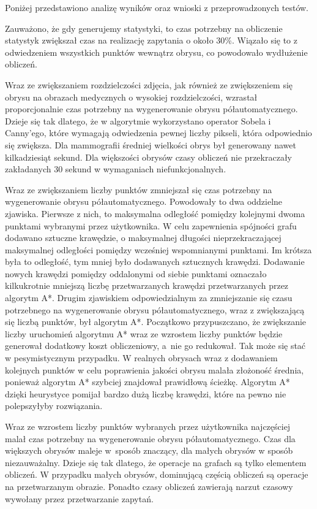\documentclass[a4paper,11pt,twoside,openright]{report}
\theoremstyle{definition}
\begin{document}
Poniżej przedstawiono analizę wyników oraz wnioski z przeprowadzonych testów.

Zauważono, że gdy generujemy statystyki, to czas potrzebny na obliczenie statystyk
zwiększał czas na realizację zapytania o około 30\%. Wiązało się to z odwiedzeniem
wszystkich punktów wewnątrz obrysu, co powodowało wydłużenie obliczeń.

Wraz ze zwiększaniem rozdzielczości zdjęcia, jak również ze zwiększeniem się
obrysu na obrazach medycznych o wysokiej rozdzielczości, wzrastał proporcjonalnie
czas potrzebny na wygenerowanie obrysu półautomatycznego. Dzieje się tak dlatego,
że w algorytmie wykorzystano operator Sobela i Canny'ego, które wymagają odwiedzenia
pewnej liczby pikseli, która odpowiednio się zwiększa. Dla mammografii średniej
wielkości obrys był generowany nawet kilkadziesiąt sekund. Dla większości obrysów
czasy obliczeń nie przekraczały zakładanych 30 sekund w wymaganiach niefunkcjonalnych.

Wraz ze zwiększaniem liczby punktów zmniejszał się czas potrzebny na wygenerowanie
obrysu półautomatycznego. Powodowały to dwa oddzielne zjawiska. Pierwsze z nich, to
maksymalna odległość pomiędzy kolejnymi dwoma punktami wybranymi przez użytkownika.
W celu zapewnienia spójności grafu dodawano sztuczne krawędzie, o maksymalnej długości
nieprzekraczającej maksymalnej odległości pomiędzy wcześniej wspomnianymi punktami.
Im krótsza była to odległość, tym mniej było dodawanych sztucznych krawędzi.
Dodawanie nowych krawędzi pomiędzy oddalonymi od siebie punktami oznaczało
kilkukrotnie mniejszą liczbę przetwarzanych krawędzi przetwarzanych przez algorytm
A*. Drugim zjawiskiem odpowiedzialnym za zmniejszanie się czasu potrzebnego na
wygenerowanie obrysu półautomatycznego, wraz z zwiększającą się liczbą punktów,
był algorytm A*. Początkowo przypuszczano, że zwiększanie liczby uruchomień algorytmu
A* wraz ze wzrostem liczby punktów będzie generował dodatkowy koszt obliczeniowy,
a~nie go redukował. Tak może się stać w pesymistycznym przypadku. W realnych
obrysach wraz z dodawaniem kolejnych punktów w celu poprawienia jakości obrysu
malała złożoność średnia, ponieważ algorytm A* szybciej znajdował prawidłową
ścieżkę. Algorytm A* dzięki heurystyce pomijał bardzo dużą liczbę krawędzi,
które na pewno nie polepszyłyby rozwiązania.

Wraz ze wzrostem liczby punktów wybranych przez użytkownika najczęściej malał
czas potrzebny na wygenerowanie obrysu półautomatycznego. Czas dla większych
obrysów maleje w~sposób znaczący, dla małych obrysów w sposób niezauważalny.
Dzieje się tak dlatego, że operacje na grafach są tylko elementem obliczeń. W
przypadku małych obrysów, dominującą częścią obliczeń są operacje na przetwarzanym
obrazie. Ponadto czasy obliczeń zawierają narzut czasowy wywołany przez
przetwarzanie zapytań.
\end{document}
